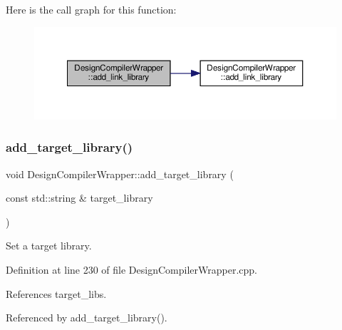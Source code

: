 Here is the call graph for this function\+:
\nopagebreak
\begin{figure}[H]
\begin{center}
\leavevmode
\includegraphics[width=350pt]{d5/d55/classDesignCompilerWrapper_aa44a4aaa4e67a1aca3e7cc80f1d9283d_cgraph}
\end{center}
\end{figure}
\mbox{\label{classDesignCompilerWrapper_a8452f034e2bfc1c8b0fb2a3b4353eb88}} 
\subsubsection{\texorpdfstring{add\+\_\+target\+\_\+library()}{add\_target\_library()}\hspace{0.1cm}{\footnotesize\ttfamily [1/2]}}
{\footnotesize\ttfamily void Design\+Compiler\+Wrapper\+::add\+\_\+target\+\_\+library (\begin{DoxyParamCaption}\item[{const std\+::string \&}]{target\+\_\+library }\end{DoxyParamCaption})}



Set a target library. 



Definition at line 230 of file Design\+Compiler\+Wrapper.\+cpp.



References target\+\_\+libs.



Referenced by add\+\_\+target\+\_\+library().

